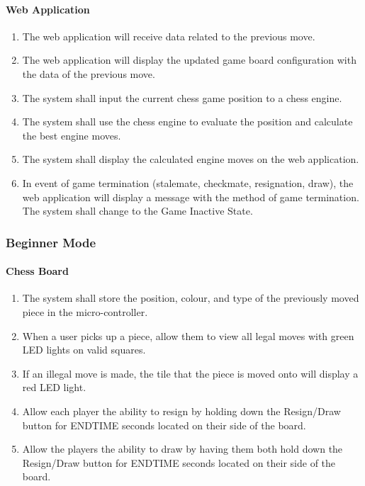 \documentclass[12pt]{article}
\begin{document}
{\paragraph{Web Application}
\begin{enumerate}[{EA}1., leftmargin=2\parindent]
    \item The web application will receive data related to the previous move.
    \item The web application will display the updated game board configuration with the data of the previous move.
    \item The system shall input the current chess game position to a chess engine.
    \item The system shall use the chess engine to evaluate the position and calculate the best engine moves.
    \item The system shall display the calculated engine moves on the web application.
    \item In event of game termination (stalemate, checkmate, resignation, draw), the web application will display a message with the method of game termination. The system shall change to the Game Inactive State.
\end{enumerate}

\subsubsection{Beginner Mode}
\paragraph{Chess Board}
\begin{enumerate}[{BB}1., leftmargin=2\parindent]
    \item The system shall store the position, colour, and type of the previously moved piece in the micro-controller.
    \item When a user picks up a piece, allow them to view all legal moves with green LED lights on valid squares.
    \item If an illegal move is made, the tile that the piece is moved onto will display a red LED light.
    \item Allow each player the ability to resign by holding down the Resign/Draw button for ENDTIME seconds located on their side of the board.
    \item Allow the players the ability to draw by having them both hold down the Resign/Draw button for ENDTIME seconds located on their side of the board.
\end{enumerate}

}
\end{document}
